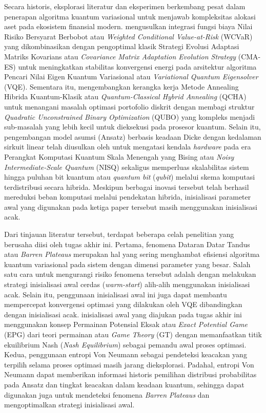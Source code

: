 Secara historis, eksplorasi literatur dan eksperimen berkembang pesat dalam penerapan algoritma kuantum variasional untuk menjawab kompleksitas alokasi aset pada ekosistem finansial modern.  mengusulkan integrasi fungsi biaya Nilai Risiko Bersyarat Berbobot atau \textit{Weighted Conditional Value-at-Risk} (WCVaR) yang dikombinasikan dengan pengoptimal klasik Strategi Evolusi Adaptasi Matriks Kovarians atau \textit{Covariance Matrix Adaptation Evolution Strategy} (CMA-ES) untuk meningkatkan stabilitas konvergensi energi pada arsitektur algoritma Pencari Nilai Eigen Kuantum Variasional atau \textit{Variational Quantum Eigensolver} (VQE). Sementara itu,  mengembangkan kerangka kerja Metode Annealing Hibrida Kuantum-Klasik atau \textit{Quantum-Classical Hybrid Annealing} (QCHA) untuk menangani masalah optimasi portofolio diskrit dengan membagi struktur \textit{Quadratic Unconstrained Binary Optimization} (QUBO) yang kompleks menjadi sub-masalah yang lebih kecil untuk dieksekusi pada prosesor kuantum. Selain itu, pengembangan model asumsi (Ansatz) berbasis keadaan Dicke dengan kedalaman sirkuit linear telah diusulkan oleh  untuk mengatasi kendala \textit{hardware} pada era Perangkat Komputasi Kuantum Skala Menengah yang Bising atau \textit{Noisy Intermediate-Scale Quantum} (NISQ) sekaligus memperluas skalabilitas sistem hingga puluhan bit kuantum atau \textit{quantum bit} (\textit{qubit}) melalui skema komputasi terdistribusi secara hibrida. Meskipun berbagai inovasi tersebut telah berhasil mereduksi beban komputasi melalui pendekatan hibrida, inisialisasi parameter awal yang digunakan pada ketiga paper tersebut masih menggunakan inisialisasi acak.

Dari tinjauan literatur tersebut, terdapat beberapa celah penelitian yang berusaha diisi oleh tugas akhir ini. Pertama, fenomena Dataran Datar Tandus atau \textit{Barren Plateaus} merupakan hal yang sering menghambat efisiensi algoritma kuantum variasional pada sistem dengan dimensi parameter yang besar. Salah satu cara untuk mengurangi risiko fenomena tersebut adalah dengan melakukan strategi inisialisasi awal cerdas (\textit{warm-start}) alih-alih menggunakan inisialisasi acak. Selain itu, penggunaan inisialisasi awal ini juga dapat membantu mempercepat konvergensi optimasi yang dilakukan oleh VQE dibandingkan dengan inisialisasi acak. inisialisasi awal yang diajukan pada tugas akhir ini menggunakan konsep Permainan Potensial Eksak atau \textit{Exact Potential Game} (EPG) dari teori permainan atau \textit{Game Theory} (GT) dengan memanfaatkan titik ekuilibrium Nash (\textit{Nash Equilibrium}) sebagai pemandu awal proses optimasi. Kedua, penggunaan entropi Von Neumann sebagai pendeteksi keacakan yang terpilih selama proses optimasi masih jarang dieksplorasi. Padahal, entropi Von Neumann dapat memberikan informasi historis pemilihan distribusi probabilitas pada Ansatz dan tingkat keacakan dalam keadaan kuantum, sehingga dapat digunakan juga untuk mendeteksi fenomena \textit{Barren Plateaus} dan mengoptimalkan strategi inisialisasi awal.

